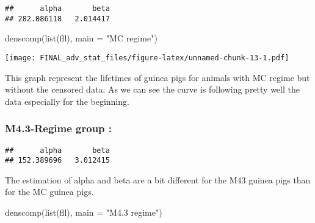 \documentclass[
]{article}
\newenvironment{Shaded}{\begin{snugshade}}{\end{snugshade}}
\newcommand{\AttributeTok}[1]{\textcolor[rgb]{0.77,0.63,0.00}{#1}}
\newcommand{\CommentTok}[1]{\textcolor[rgb]{0.56,0.35,0.01}{\textit{#1}}}
\newcommand{\DecValTok}[1]{\textcolor[rgb]{0.00,0.00,0.81}{#1}}
\newcommand{\FunctionTok}[1]{\textcolor[rgb]{0.00,0.00,0.00}{#1}}
\newcommand{\NormalTok}[1]{#1}
\newcommand{\OtherTok}[1]{\textcolor[rgb]{0.56,0.35,0.01}{#1}}
\newcommand{\SpecialCharTok}[1]{\textcolor[rgb]{0.00,0.00,0.00}{#1}}
\newcommand{\StringTok}[1]{\textcolor[rgb]{0.31,0.60,0.02}{#1}}
\begin{document}
\begin{verbatim}
##      alpha       beta 
## 282.086118   2.014417
\end{verbatim}

\begin{Shaded}
\begin{Highlighting}[]
\FunctionTok{denscomp}\NormalTok{(}\FunctionTok{list}\NormalTok{(fll), }\AttributeTok{main =} \StringTok{"MC regime"}\NormalTok{)}
\end{Highlighting}
\end{Shaded}

\texttt{[image: FINAL\_adv\_stat\_files/figure-latex/unnamed-chunk-13-1.pdf]}

This graph represent the lifetimes of guinea pigs for animals with MC
regime but without the censored data. As we can see the curve is
following pretty well the data especially for the beginning.

\hypertarget{m4.3-regime-group}{%
\subsubsection{M4.3-Regime group :}\label{m4.3-regime-group}}

\begin{Shaded}
\end{Shaded}

\begin{verbatim}
##      alpha       beta 
## 152.389696   3.012415
\end{verbatim}

The estimation of alpha and beta are a bit different for the M43 guinea
pigs than for the MC guinea pigs.

\begin{Shaded}
\begin{Highlighting}[]
\FunctionTok{denscomp}\NormalTok{(}\FunctionTok{list}\NormalTok{(fll), }\AttributeTok{main =} \StringTok{"M4.3 regime"}\NormalTok{)}
\end{Highlighting}
\end{Shaded}
\end{document}

